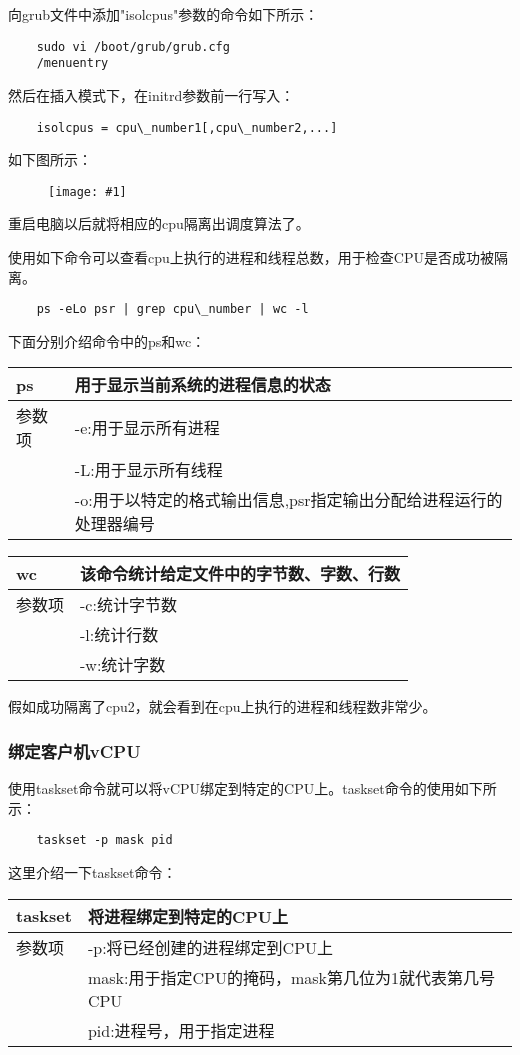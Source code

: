 \documentclass[a4paper,left=2.5cm,right=2.5cm,11pt]{article}
\newcommand{\fic}[1]{\begin{figure}[H]
		\center
		\texttt{[image: \#1]}
	\end{figure}}
\newcommand{\interval}{\vspace{0.5em}}
\newcommand{\tablestart}{
	\interval
	\begin{longtable}{p{2cm}p{10cm}}
	\hline}
\newcommand{\tableend}{
	\hline
	\end{longtable}
	\interval}
\begin{document}
	向grub文件中添加"isolcpus"参数的命令如下所示：
	\begin{lstlisting}
	sudo vi /boot/grub/grub.cfg
	/menuentry
	\end{lstlisting}
	
	然后在插入模式下，在initrd参数前一行写入：
	\begin{lstlisting}
	isolcpus = cpu\_number1[,cpu\_number2,...]
	\end{lstlisting}

	如下图所示：
	\fic{2.png}

	重启电脑以后就将相应的cpu隔离出调度算法了。\par

	使用如下命令可以查看cpu上执行的进程和线程总数，用于检查CPU是否成功被隔离。

	\begin{lstlisting}
	ps -eLo psr | grep cpu\_number | wc -l
	\end{lstlisting}

	下面分别介绍命令中的ps和wc：
	\tablestart
	ps & 用于显示当前系统的进程信息的状态\\
	\hline
	参数项 & -e:用于显示所有进程 \\
		& -L:用于显示所有线程 \\
		& -o:用于以特定的格式输出信息,psr指定输出分配给进程运行的处理器编号 \\
	\tableend

	\tablestart
	wc & 该命令统计给定文件中的字节数、字数、行数 \\
	\hline
	参数项 & -c:统计字节数 \\
		  & -l:统计行数 \\
		  & -w:统计字数 \\
	\tableend

	假如成功隔离了cpu2，就会看到在cpu上执行的进程和线程数非常少。
	
\subsubsection{绑定客户机vCPU}
	使用taskset命令就可以将vCPU绑定到特定的CPU上。taskset命令的使用如下所示：
	\begin{lstlisting}
	taskset -p mask pid
	\end{lstlisting}

	这里介绍一下taskset命令：
	\tablestart
	taskset & 将进程绑定到特定的CPU上 \\
	\hline
	参数项 & -p:将已经创建的进程绑定到CPU上 \\
		 & mask:用于指定CPU的掩码，mask第几位为1就代表第几号CPU \\
		 & pid:进程号，用于指定进程 \\
	\tableend
\end{document}
